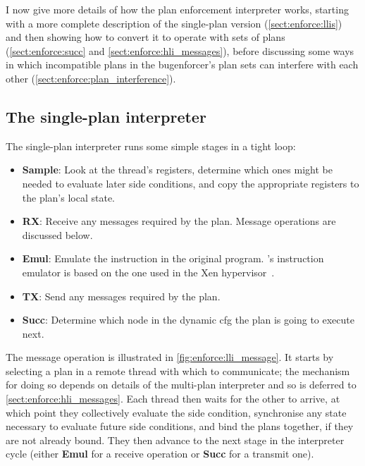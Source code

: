 I now give more details of how the plan enforcement interpreter works,
starting with a more complete description of the single-plan version
(\autoref{sect:enforce:llis}) and then showing how to convert it to
operate with sets of plans (\autoref{sect:enforce:succ} and
\autoref{sect:enforce:hli_messages}), before discussing some ways in
which incompatible plans in the \gls{bugenforcer}'s plan sets can
interfere with each other (\autoref{sect:enforce:plan_interference}).

\subsection{The single-plan interpreter}
\label{sect:enforce:llis}

The single-plan interpreter runs some simple stages in a tight loop:
\begin{itemize}
\item \textbf{Sample}: Look at the thread's registers, determine which
  ones might be needed to evaluate later \glspl{side condition}, and copy the
  appropriate registers to the plan's local state.

\item \textbf{RX}: Receive any messages required by the plan.  Message
  operations are discussed below.

\item \textbf{Emul}: Emulate the instruction in the original program.
  {\Implementation}'s instruction emulator is based on the one used in
  the Xen hypervisor~\cite{XenInstructionEmul}.

\item \textbf{TX}: Send any messages required by the plan.

\item \textbf{Succ}: Determine which node in the \gls{dynamic cfg} the
  plan is going to execute next.
\end{itemize}
The message operation is illustrated in
\autoref{fig:enforce:lli_message}.  It starts by selecting a plan in a
remote thread with which to communicate; the mechanism for doing so
depends on details of the multi-plan interpreter and so is deferred to
\autoref{sect:enforce:hli_messages}.  Each thread then waits for the
other to arrive, at which point they collectively evaluate the
\gls{side condition}, synchronise any state necessary to evaluate
future \glspl{side condition}, and bind the plans together, if they
are not already bound.  They then advance to the next stage in the
interpreter cycle (either \textbf{Emul} for a receive operation or
\textbf{Succ} for a transmit one).


